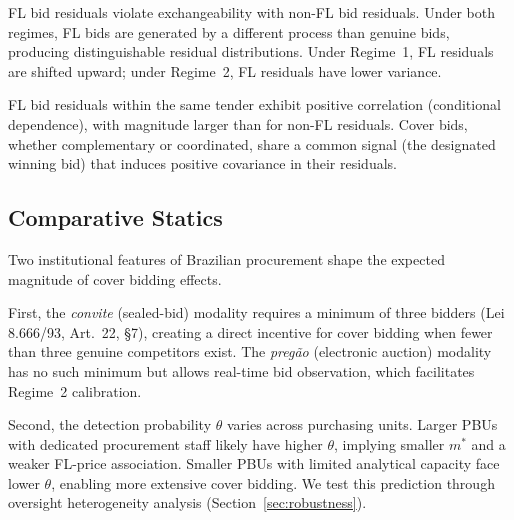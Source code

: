 \begin{prediction}
\label{pred:exchange}
FL bid residuals violate exchangeability with non-FL bid residuals. Under
both regimes, FL bids are generated by a different process than genuine
bids, producing distinguishable residual distributions. Under Regime~1,
FL residuals are shifted upward; under Regime~2, FL residuals have
lower variance.
\end{prediction}

\begin{prediction}
\label{pred:independence}
FL bid residuals within the same tender exhibit positive correlation
(conditional dependence), with magnitude larger than for non-FL
residuals. Cover bids, whether complementary or coordinated, share a
common signal (the designated winning bid) that induces positive
covariance in their residuals.
\end{prediction}

\subsection{Comparative Statics}

Two institutional features of Brazilian procurement shape the expected
magnitude of cover bidding effects.

First, the \emph{convite} (sealed-bid) modality requires a minimum of
three bidders (Lei 8.666/93, Art.~22, \S7), creating a direct incentive
for cover bidding when fewer than three genuine competitors exist. The
\emph{preg\~ao} (electronic auction) modality has no such minimum but
allows real-time bid observation, which facilitates Regime~2 calibration.

Second, the detection probability $\theta$ varies across purchasing
units. Larger PBUs with dedicated procurement staff likely have higher
$\theta$, implying smaller $m^*$ and a weaker FL-price association.
Smaller PBUs with limited analytical capacity face lower $\theta$,
enabling more extensive cover bidding. We test this prediction through
oversight heterogeneity analysis (Section~\ref{sec:robustness}).
